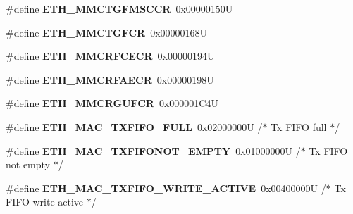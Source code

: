 \begin{DoxyCompactItemize}
\item 
\mbox{\label{group___h_a_l___e_t_h___aliased___defines_gad2324378454cb5afc2709afc6849067d}} 
\#define {\bfseries E\+T\+H\+\_\+\+M\+M\+C\+T\+G\+F\+M\+S\+C\+CR}~0x00000150U
\item 
\mbox{\label{group___h_a_l___e_t_h___aliased___defines_ga1de87b7bf29865be1068300dd2946caf}} 
\#define {\bfseries E\+T\+H\+\_\+\+M\+M\+C\+T\+G\+F\+CR}~0x00000168U
\item 
\mbox{\label{group___h_a_l___e_t_h___aliased___defines_gacb9b04ab9c5957905a2db7314d6907b8}} 
\#define {\bfseries E\+T\+H\+\_\+\+M\+M\+C\+R\+F\+C\+E\+CR}~0x00000194U
\item 
\mbox{\label{group___h_a_l___e_t_h___aliased___defines_ga99f6ddc380fffdfe66e6659f7c4ba325}} 
\#define {\bfseries E\+T\+H\+\_\+\+M\+M\+C\+R\+F\+A\+E\+CR}~0x00000198U
\item 
\mbox{\label{group___h_a_l___e_t_h___aliased___defines_gadd605f380a482a06a59498eea4cad15f}} 
\#define {\bfseries E\+T\+H\+\_\+\+M\+M\+C\+R\+G\+U\+F\+CR}~0x000001\+C4U
\item 
\mbox{\label{group___h_a_l___e_t_h___aliased___defines_ga568f5f8aa8a6dc34f446e303adac0e6d}} 
\#define {\bfseries E\+T\+H\+\_\+\+M\+A\+C\+\_\+\+T\+X\+F\+I\+F\+O\+\_\+\+F\+U\+LL}~0x02000000\+U  /$\ast$ Tx F\+I\+F\+O full $\ast$/
\item 
\mbox{\label{group___h_a_l___e_t_h___aliased___defines_ga4c428a862f392d95b5dd889e8cd96924}} 
\#define {\bfseries E\+T\+H\+\_\+\+M\+A\+C\+\_\+\+T\+X\+F\+I\+F\+O\+N\+O\+T\+\_\+\+E\+M\+P\+TY}~0x01000000\+U  /$\ast$ Tx F\+I\+F\+O not empty $\ast$/
\item 
\mbox{\label{group___h_a_l___e_t_h___aliased___defines_gaff6cebd747512114367fa01ef36e0394}} 
\#define {\bfseries E\+T\+H\+\_\+\+M\+A\+C\+\_\+\+T\+X\+F\+I\+F\+O\+\_\+\+W\+R\+I\+T\+E\+\_\+\+A\+C\+T\+I\+VE}~0x00400000\+U  /$\ast$ Tx F\+I\+F\+O write active $\ast$/

\end{DoxyCompactItemize}

